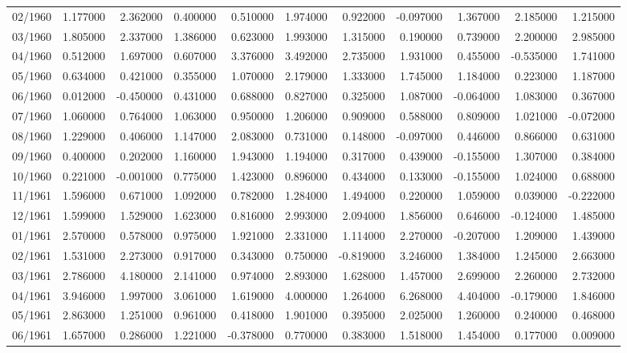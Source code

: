 \begin{tabular}{lrrrrrrrrrr}
02/1960 & 1.177000 & 2.362000 & 0.400000 & 0.510000 & 1.974000 & 0.922000 & -0.097000 & 1.367000 & 2.185000 & 1.215000 \\
03/1960 & 1.805000 & 2.337000 & 1.386000 & 0.623000 & 1.993000 & 1.315000 & 0.190000 & 0.739000 & 2.200000 & 2.985000 \\
04/1960 & 0.512000 & 1.697000 & 0.607000 & 3.376000 & 3.492000 & 2.735000 & 1.931000 & 0.455000 & -0.535000 & 1.741000 \\
05/1960 & 0.634000 & 0.421000 & 0.355000 & 1.070000 & 2.179000 & 1.333000 & 1.745000 & 1.184000 & 0.223000 & 1.187000 \\
06/1960 & 0.012000 & -0.450000 & 0.431000 & 0.688000 & 0.827000 & 0.325000 & 1.087000 & -0.064000 & 1.083000 & 0.367000 \\
07/1960 & 1.060000 & 0.764000 & 1.063000 & 0.950000 & 1.206000 & 0.909000 & 0.588000 & 0.809000 & 1.021000 & -0.072000 \\
08/1960 & 1.229000 & 0.406000 & 1.147000 & 2.083000 & 0.731000 & 0.148000 & -0.097000 & 0.446000 & 0.866000 & 0.631000 \\
09/1960 & 0.400000 & 0.202000 & 1.160000 & 1.943000 & 1.194000 & 0.317000 & 0.439000 & -0.155000 & 1.307000 & 0.384000 \\
10/1960 & 0.221000 & -0.001000 & 0.775000 & 1.423000 & 0.896000 & 0.434000 & 0.133000 & -0.155000 & 1.024000 & 0.688000 \\
11/1961 & 1.596000 & 0.671000 & 1.092000 & 0.782000 & 1.284000 & 1.494000 & 0.220000 & 1.059000 & 0.039000 & -0.222000 \\
12/1961 & 1.599000 & 1.529000 & 1.623000 & 0.816000 & 2.993000 & 2.094000 & 1.856000 & 0.646000 & -0.124000 & 1.485000 \\
01/1961 & 2.570000 & 0.578000 & 0.975000 & 1.921000 & 2.331000 & 1.114000 & 2.270000 & -0.207000 & 1.209000 & 1.439000 \\
02/1961 & 1.531000 & 2.273000 & 0.917000 & 0.343000 & 0.750000 & -0.819000 & 3.246000 & 1.384000 & 1.245000 & 2.663000 \\
03/1961 & 2.786000 & 4.180000 & 2.141000 & 0.974000 & 2.893000 & 1.628000 & 1.457000 & 2.699000 & 2.260000 & 2.732000 \\
04/1961 & 3.946000 & 1.997000 & 3.061000 & 1.619000 & 4.000000 & 1.264000 & 6.268000 & 4.404000 & -0.179000 & 1.846000 \\
05/1961 & 2.863000 & 1.251000 & 0.961000 & 0.418000 & 1.901000 & 0.395000 & 2.025000 & 1.260000 & 0.240000 & 0.468000 \\
06/1961 & 1.657000 & 0.286000 & 1.221000 & -0.378000 & 0.770000 & 0.383000 & 1.518000 & 1.454000 & 0.177000 & 0.009000 \\

\end{tabular}
